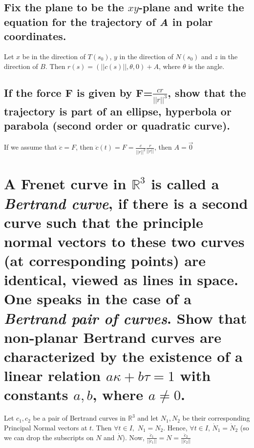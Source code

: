 \documentclass[12pt]{amsart}
\begin{document}
\subsection{Fix the plane to be the $xy$-plane and write the equation for the trajectory of \emph{A} in polar coordinates.}
Let $x$ be in the direction of $T(s_0)$, $y$ in the direction of $N(s_0)$ and $z$ in the direction of $B$. Then $r(s)=(||c(s)||,\theta,0)+A$, where $\theta$ is the angle.

\subsection{If the force \textbf{F} is given by \textbf{F}=$\frac{cr}{||r||^3}$, show that the trajectory is part of an ellipse, hyperbola or parabola (second order or quadratic curve).}
If we assume that $\ddot c=F$, then $\ddot c(t)=F=\frac{c}{||r||^2}\frac{r}{||r||}$, then $A=\vec0$ 

\setcounter{equation}{0}
\section{A Frenet curve in $\mathbb{R}^3$ is called a \emph{Bertrand curve}, if there is a second curve such that the principle normal vectors to these two curves (at corresponding points) are identical, viewed as lines in space. One speaks in the case of a \emph{Bertrand pair of curves}. Show that non-planar Bertrand curves are characterized by the existence of a linear relation $a\kappa+b\tau=1$ with constants $a,b$, where $a\neq0$.} Let $c_1,c_2$ be a pair of Bertrand curves in $\mathbb{R}^3$ and let $N_1,N_2$ be their corresponding Principal Normal vectors at $t$. Then $\forall t\in I,$ $N_1=N_2$. Hence, $\forall t\in I$, $\dot N_1=\dot N_2$ (so we can drop the subscripts on $N$ and $\dot N$). Now, $\frac{\ddot c_1}{||\ddot c_1||}=N=\frac{\ddot c_2}{||\ddot c_2||}$
\begin{comment}Since,
\[\left(\begin{array}{c}
	T_1 \\
	N_1 \\
	B_1
\end{array} \right)' =\left(\begin{array}{ccc}
	0 & \kappa_1 & 0 \\
	-\kappa_1 & 0 & \tau_1 \\
	0 & -\tau_1 & 0
\end{array} \right)
\left(\begin{array}{c}
	T_1\\
	N_1\\
	B_1
\end{array}\right) \]
we know, $-\kappa_1T_1+\tau_1B_1=-\kappa_2T_2+\tau_2B_2$, and $\frac{T_1'}{\kappa_1}=\frac{T_2'}{\kappa_2}$
\end{comment}
\end{document}
